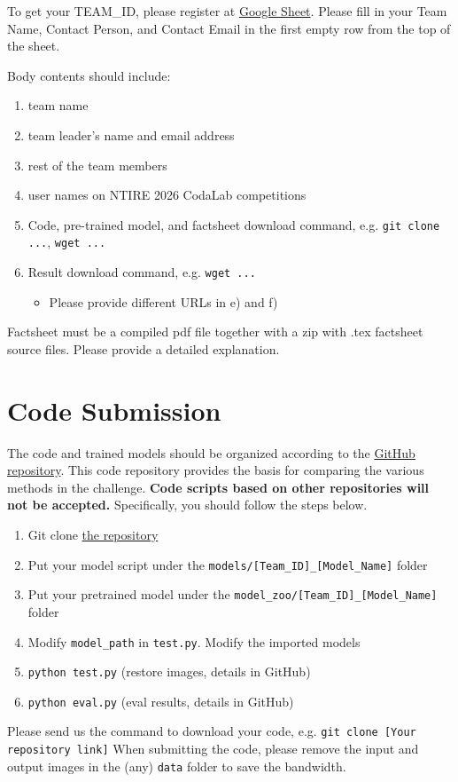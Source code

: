 \documentclass[10pt,twocolumn,letterpaper]{article}
\begin{document}
To get your TEAM\_ID, please register at \href{https://docs.google.com/spreadsheets/d/1TR5yivh3o2FeALDMKvRtxOQpkDrk61LNNZVlM1vG5u4/edit?usp=sharing}{Google Sheet}. Please fill in your Team Name, Contact Person, and Contact Email in the first empty row from the top of the sheet.

Body contents should include: 

\begin{enumerate}[label=\alph*)]
\item team name 
\item team leader's name and email address 
\item rest of the team members 
\item user names on NTIRE 2026 CodaLab competitions %
\item Code, pre-trained model, and factsheet download command, e.g. \texttt{git clone ...}, \texttt{wget ...}
\item Result download command, e.g. \texttt{wget ...}
\begin{itemize}
    \item Please provide different URLs in e) and f)
\end{itemize}
\end{enumerate}

\noindent Factsheet must be a compiled pdf file together with a zip with .tex factsheet source files. Please provide a detailed explanation.

\section{Code Submission}

The code and trained models should be organized according to the \href{https://github.com/Kai-Liu001/NTIRE2026_infraredSR}{GitHub repository}. This code repository provides the basis for comparing the various methods in the challenge. \textbf{Code scripts based on other repositories will not be accepted.} Specifically, you should follow the steps below.
\begin{enumerate}
    \item Git clone \href{https://github.com/Kai-Liu001/NTIRE2026_infraredSR}{the repository}
    \item Put your model script under the \texttt{models/[Team\_ID]\_[Model\_Name]} folder
    \item Put your pretrained model under the \texttt{model\_zoo/[Team\_ID]\_[Model\_Name]} folder
    \item Modify \texttt{model\_path} in \texttt{test.py}. Modify the imported models
    \item \texttt{python test.py} (restore images, details in GitHub)
    \item \texttt{python eval.py} (eval results, details in GitHub)
\end{enumerate}
Please send us the command to download your code, e.g. \texttt{git clone [Your repository link]}
When submitting the code, please remove the input and output images in the (any) \texttt{data} folder to save the bandwidth.
\end{document}
